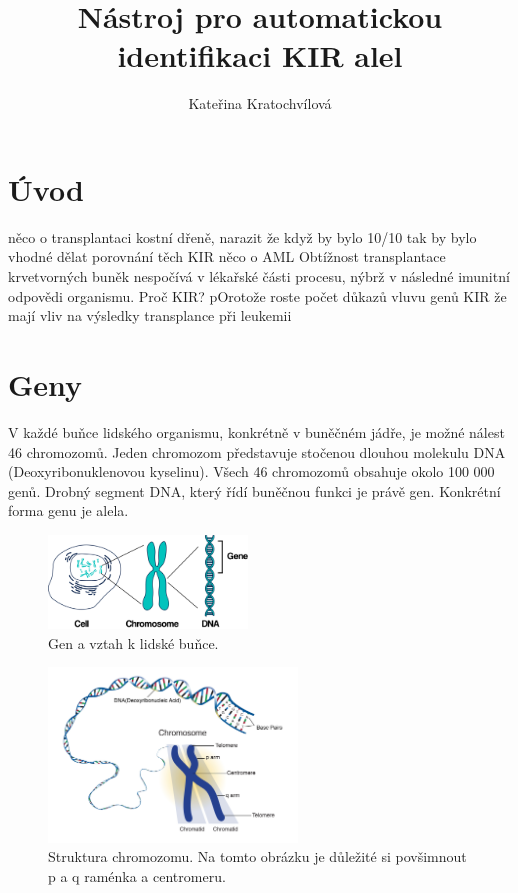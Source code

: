 \documentclass[czech,DP]{thesiskiv}
\author{Kateřina Kratochvílová}
\title{Nástroj pro automatickou identifikaci KIR alel}
\begin{document}
%
\maketitle
\tableofcontents

\chapter{Úvod}

něco o transplantaci kostní dřeně, narazit že když by bylo 10/10 tak by bylo vhodné dělat porovnání těch KIR
něco o AML
Obtížnost transplantace krvetvorných buněk nespočívá v lékařské části procesu,
nýbrž v následné imunitní odpovědi organismu.
Proč KIR? pOrotože roste počet důkazů vluvu genů KIR že mají vliv na výsledky transplance  při leukemii



\chapter{Geny}
V každé buňce lidského organismu, konkrétně v buněčném jádře, je možné nálest 46 chromozomů. Jeden chromozom představuje stočenou dlouhou molekulu DNA (Deoxyribonuklenovou kyselinu). Všech 46 chromozomů obsahuje okolo 100 000 genů. Drobný segment DNA, který řídí buněčnou funkci je právě gen. Konkrétní forma genu je alela. \citep{en_smith}

\begin{figure}[H]		
		\centering
		\includegraphics[width=200px]{./img/lidska_bunka.png}
		\caption{Gen a vztah k lidské buňce. \cite{human_cell}}
		\label{fig:bunka_gen}
\end{figure}

\begin{figure}[H]		
		\centering
		\includegraphics[width=250px]{./img/chromosome.jpg}
		\caption{Struktura chromozomu. Na tomto obrázku je důležité si povšimnout p a q raménka a centromeru. \cite{chromosome_structure}}
		\label{fig:chrmosome}
\end{figure}
\end{document}
